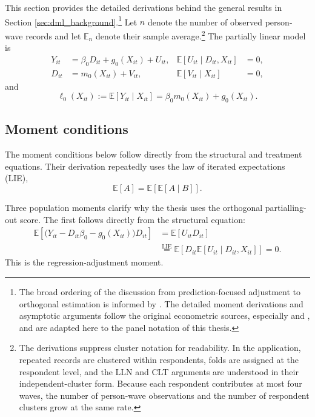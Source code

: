 \documentclass[11pt,oneside,a4paper]{book}
\begin{document}
This section provides the detailed derivations behind the general results in Section \ref{sec:dml_background}.\footnote{The broad ordering of the discussion from prediction-focused adjustment to orthogonal estimation is informed by \citet{helal2026returns}. The detailed moment derivations and asymptotic arguments follow the original econometric sources, especially \citet{robinson1988rootn} and \citet{chernozhukov2018dml}, and are adapted here to the panel notation of this thesis.} Let \(n\) denote the number of observed person-wave records and let \(\mathbb{E}_n\) denote their sample average.\footnote{The derivations suppress cluster notation for readability. In the application, repeated records are clustered within respondents, folds are assigned at the respondent level, and the LLN and CLT arguments are understood in their independent-cluster form. Because each respondent contributes at most four waves, the number of person-wave observations and the number of respondent clusters grow at the same rate.} The partially linear model is
\begin{align*}
Y_{it} &= \beta_0D_{it}+g_0(X_{it})+U_{it},
& \mathbb{E}[U_{it}\mid D_{it},X_{it}]&=0, \\
D_{it} &= m_0(X_{it})+V_{it},
& \mathbb{E}[V_{it}\mid X_{it}]&=0,
\end{align*}
and
\begin{equation*}
\ell_0(X_{it})
:=
\mathbb{E}[Y_{it}\mid X_{it}]
=
\beta_0m_0(X_{it})+g_0(X_{it}).
\end{equation*}

\subsection[Moment Conditions]{Moment conditions}

The moment conditions below follow directly from the structural and treatment equations. Their derivation repeatedly uses the law of iterated expectations (LIE),
\begin{equation*}
\mathbb{E}[A]
=
\mathbb{E}\!\left[\mathbb{E}[A\mid B]\right].
\end{equation*}

Three population moments clarify why the thesis uses the orthogonal partialling-out score. The first follows directly from the structural equation:
\begin{align*}
\mathbb{E}\!\left[
\bigl(Y_{it}-D_{it}\beta_0-g_0(X_{it})\bigr)D_{it}
\right]
&=
\mathbb{E}[U_{it}D_{it}] \\
&\overset{\mathrm{LIE}}{=}
\mathbb{E}\!\left[
D_{it}\mathbb{E}[U_{it}\mid D_{it},X_{it}]
\right]
=0.
\end{align*}
This is the regression-adjustment moment.
\end{document}
